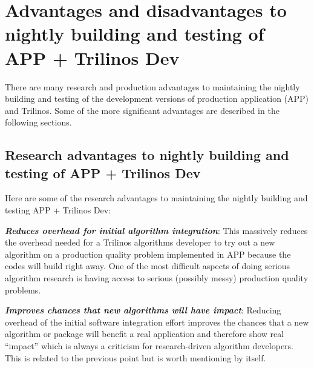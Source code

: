 \documentclass[pdf,ps2pdf,11pt]{SANDreport}
\begin{document}
%
{}\section{Advantages and disadvantages to nightly building and testing of APP
+ Trilinos Dev}
%

There are many research and production advantages to maintaining the nightly
building and testing of the development versions of production application
(APP) and Trilinos.  Some of the more significant advantages are described in
the following sections.


%
{}\subsection{Research advantages to nightly building and testing of APP +
Trilinos Dev}
%

Here are some of the research advantages to maintaining the nightly building
and testing APP + Trilinos Dev:

{}\textit{\textbf{Reduces overhead for initial algorithm integration}}: This
massively reduces the overhead needed for a Trilinos algorithms developer to
try out a new algorithm on a production quality problem implemented in APP
because the codes will build right away.  One of the most difficult aspects of
doing serious algorithm research is having access to serious (possibly messy)
production quality problems.

{}\textit{\textbf{Improves chances that new algorithms will have impact}}:
Reducing overhead of the initial software integration effort improves the
chances that a new algorithm or package will benefit a real application and
therefore show real ``impact'' which is always a criticism for research-driven
algorithm developers.  This is related to the previous point but is worth
mentioning by itself.
\end{document}
